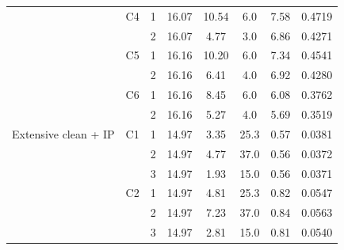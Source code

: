 {\begin{longtable}{llcccccc}
     & C4 & 1 & 16.07 & 10.54 & 6.0 & 7.58 & 0.4719 \\
     &  & 2 & 16.07 & 4.77 & 3.0 & 6.86 & 0.4271 \\
    \addlinespace[2pt]
     & C5 & 1 & 16.16 & 10.20 & 6.0 & 7.34 & 0.4541 \\
     &  & 2 & 16.16 & 6.41 & 4.0 & 6.92 & 0.4280 \\
    \addlinespace[2pt]
     & C6 & 1 & 16.16 & 8.45 & 6.0 & 6.08 & 0.3762 \\
     &  & 2 & 16.16 & 5.27 & 4.0 & 5.69 & 0.3519 \\
    \midrule
    Extensive clean + IP & C1 & 1 & 14.97 & 3.35 & 25.3 & 0.57 & 0.0381 \\
     &  & 2 & 14.97 & 4.77 & 37.0 & 0.56 & 0.0372 \\
     &  & 3 & 14.97 & 1.93 & 15.0 & 0.56 & 0.0371 \\
    \addlinespace[2pt]
     & C2 & 1 & 14.97 & 4.81 & 25.3 & 0.82 & 0.0547 \\
     &  & 2 & 14.97 & 7.23 & 37.0 & 0.84 & 0.0563 \\
     &  & 3 & 14.97 & 2.81 & 15.0 & 0.81 & 0.0540 \\
  \bottomrule
\end{longtable}}

